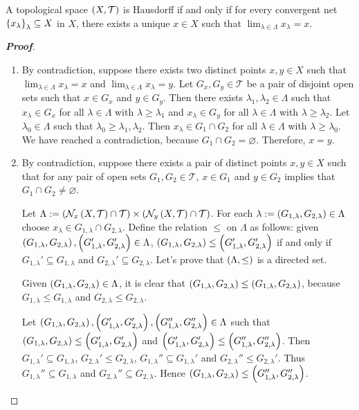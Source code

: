 \begin{proposition}
  A topological space $\left(X,\mathcal{T}\right)$ is Hausdorff if and only if for every convergent net $\left\{x_\lambda\right\}_{\lambda}\subseteq X$ in $X$, there exists a unique $x\in X$ such that $\lim_{\lambda\in\Lambda}{x_{\lambda}}=x$.

  \begin{proof}[\rm\textbf{Proof}]
    \hfill
    \begin{enumerate}
      \item[\boxed{\Rightarrow}] By contradiction, suppose there exists two distinct points $x,y\in X$ such that $\lim_{\lambda\in\Lambda}{x_{\lambda}}=x$ and $\lim_{\lambda\in\Lambda}{x_{\lambda}}=y$. Let $G_x,G_y\in\mathcal{T}$ be a pair of disjoint open sets such that $x\in G_x$ and $y\in G_y$. Then there exists $\lambda_1,\lambda_2\in\Lambda$ such that $x_{\lambda}\in G_x$ for all $\lambda\in\Lambda$ with $\lambda\geq \lambda_1$ and $x_{\lambda}\in G_y$ for all $\lambda\in\Lambda$ with $\lambda\geq \lambda_2$. Let $\lambda_0\in\Lambda$ such that $\lambda_0\geq\lambda_1,\lambda_2$. Then $x_\lambda\in G_1\cap G_2$ for all $\lambda\in\Lambda$ with $\lambda\geq\lambda_0$. We have reached a contradiction, because $G_1\cap G_2=\varnothing$. Therefore, $x=y$.
      \item[\boxed{\Leftarrow}] By contradiction, suppose there exists a pair of distinct points $x,y\in X$ such that for any pair of open sets $G_1,G_2\in\mathcal{T}$, $x\in G_1$ and $y\in G_2$ implies that $G_1\cap G_2\neq\varnothing$. 
      
      Let $\Lambda:=\left(\mathcal{N}_x\left(X,\mathcal{T}\right)\cap\mathcal{T}\right)\times\left(\mathcal{N}_y\left(X,\mathcal{T}\right)\cap\mathcal{T}\right)$. For each $\lambda:=\left(G_{1,\lambda},G_{2,\lambda}\right)\in\Lambda$ choose $x_\lambda\in G_{1,\lambda}\cap G_{2,\lambda}$. Define the relation $\leq$ on $\Lambda$ as follows: given $\left(G_{1,\lambda},G_{2,\lambda}\right),\left(G_{1,\lambda}',G_{2,\lambda}'\right)\in\Lambda$, $\left(G_{1,\lambda},G_{2,\lambda}\right)\leq\left(G_{1,\lambda}',G_{2,\lambda}'\right)$ if and only if $G_{1,\lambda}'\subseteq G_{1,\lambda}$ and $G_{2,\lambda}'\subseteq G_{2,\lambda}$. Let's prove that $\left(\Lambda,\leq\right)$ is a directed set.

      Given $\left(G_{1,\lambda},G_{2,\lambda}\right)\in\Lambda$, it is clear that $\left(G_{1,\lambda},G_{2,\lambda}\right)\leq\left(G_{1,\lambda},G_{2,\lambda}\right)$, because $G_{1,\lambda}\leq G_{1,\lambda}$ and $G_{2,\lambda}\leq G_{2,\lambda}$.

      Let $\left(G_{1,\lambda},G_{2,\lambda}\right),\left(G_{1,\lambda}',G_{2,\lambda}'\right),\left(G_{1,\lambda}'',G_{2,\lambda}''\right)\in\Lambda$ such that $\left(G_{1,\lambda},G_{2,\lambda}\right)\leq\left(G_{1,\lambda}',G_{2,\lambda}'\right)$ and $\left(G_{1,\lambda}',G_{2,\lambda}'\right)\leq\left(G_{1,\lambda}'',G_{2,\lambda}''\right)$. Then $G_{1,\lambda}'\subseteq G_{1,\lambda}$, $G_{2,\lambda}'\leq G_{2,\lambda}$, $G_{1,\lambda}''\subseteq G_{1,\lambda}'$ and $G_{2,\lambda}''\leq G_{2,\lambda}'$. Thus $G_{1,\lambda}''\subseteq G_{1,\lambda}$ and $G_{2,\lambda}''\subseteq G_{2,\lambda}$. Hence $\left(G_{1,\lambda},G_{2,\lambda}\right)\leq\left(G_{1,\lambda}'',G_{2,\lambda}''\right)$.


\end{enumerate}
\end{proof}
\end{proposition}
